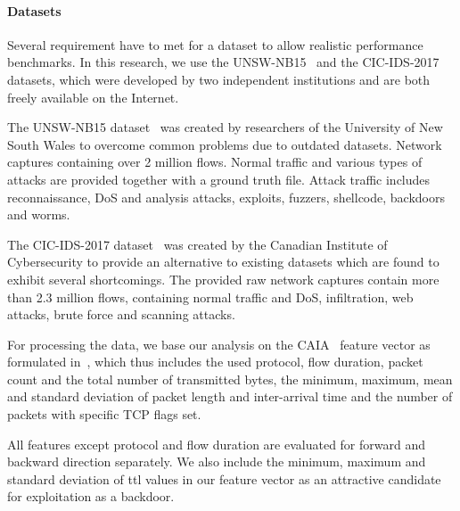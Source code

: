 \documentclass[10pt,sigconf,letterpaper,dvipsnames]{acmart}
\newcommand\note[2]{{\color{#1}#2}}
\newcommand\todo[1]{{\note{red}{TODO: #1}}}
\newcommand{\unsw}{UNSW-NB15}
\begin{document}
\paragraph{Datasets}

Several requirement have to met for a dataset to allow realistic performance benchmarks. %
In this research, we use the \unsw{}~\cite{moustafa_unsw-nb15:_2015} and the CIC-IDS-2017~\cite{sharafaldin_toward_2018} datasets, which were developed by two independent institutions and are both freely available on the Internet. %

The \unsw{} dataset~\cite{moustafa_unsw-nb15:_2015} was created by researchers of the University of New South Wales to overcome common problems due to outdated datasets. Network captures containing over 2 million flows. Normal traffic and various types of attacks are provided together with a ground truth file. Attack traffic includes reconnaissance, DoS and analysis attacks, exploits, fuzzers,  shellcode, backdoors and worms.

The CIC-IDS-2017 dataset~\cite{sharafaldin_toward_2018} was created by the Canadian Institute of Cybersecurity to provide an alternative to existing datasets which are found to exhibit several shortcomings. The provided raw network captures contain more than 2.3 million flows, containing normal traffic and DoS, infiltration, web attacks, brute force and scanning attacks.

For processing the data, we base our analysis on the CAIA~\cite{williams_preliminary_2006} feature vector as formulated in~\cite{meghdouri_analysis_2018}, which thus includes the used protocol, flow duration, packet count and the total number of transmitted bytes, the minimum, maximum, mean and standard deviation of packet length and inter-arrival time and the number of packets with specific TCP flags set.

All features except protocol and flow duration are evaluated for forward and backward direction separately.
We also include the minimum, maximum and standard deviation of \gls{ttl} values in our feature vector as an attractive candidate for exploitation as a backdoor. %
\end{document}
